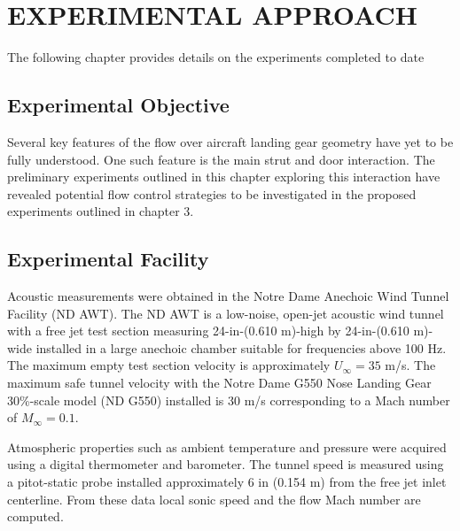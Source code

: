 %
%
%
%
%
%
%
%
%
%


%
%

\chapter{EXPERIMENTAL APPROACH}
The following chapter provides details on the experiments completed to date

\section{Experimental Objective}
Several key features of the flow over aircraft landing gear geometry have yet to be fully understood. One such feature is the main strut and door interaction. The preliminary experiments outlined in this chapter exploring this interaction have revealed potential flow control strategies to be investigated in the proposed experiments outlined in chapter 3.


\section{Experimental Facility}
Acoustic measurements were obtained in the Notre Dame Anechoic Wind Tunnel Facility (ND AWT). The ND AWT is a low-noise, open-jet acoustic wind tunnel with a free jet test section measuring 24-in-(0.610 m)-high by 24-in-(0.610 m)-wide installed in a large anechoic chamber suitable for frequencies above 100 Hz. The maximum empty test section velocity is approximately $U_\infty = 35$ m/s. The maximum safe tunnel velocity with the Notre Dame G550 Nose Landing Gear 30\%-scale model (ND G550) installed is  30 m/s corresponding to a Mach number of $M_\infty=0.1$.

Atmospheric properties such as ambient temperature and pressure were acquired using a digital thermometer and barometer. The tunnel speed is measured using a pitot-static probe installed approximately 6 in (0.154 m) from the free jet inlet centerline. From these data local sonic speed and the flow Mach number are computed.

